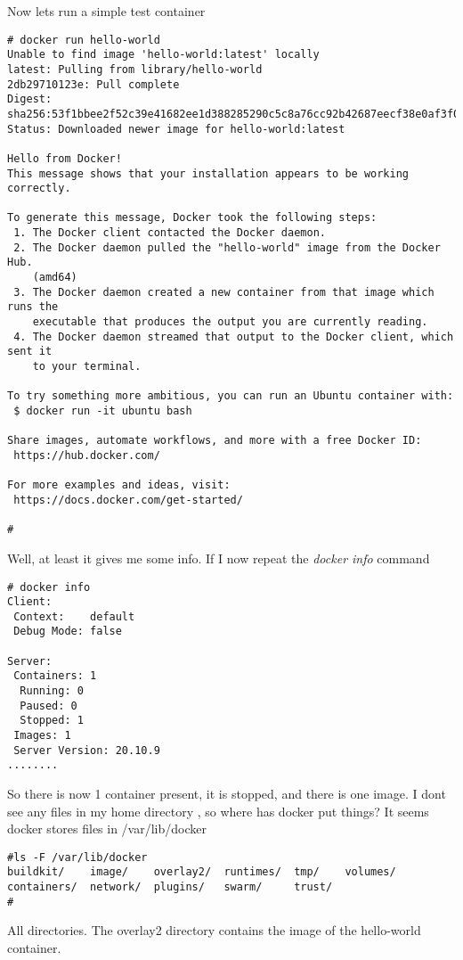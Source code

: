 \documentclass{article}  %
\begin{document}
Now lets run a simple test container
\begin{verbatim}
# docker run hello-world
Unable to find image 'hello-world:latest' locally
latest: Pulling from library/hello-world
2db29710123e: Pull complete 
Digest: sha256:53f1bbee2f52c39e41682ee1d388285290c5c8a76cc92b42687eecf38e0af3f0
Status: Downloaded newer image for hello-world:latest

Hello from Docker!
This message shows that your installation appears to be working correctly.

To generate this message, Docker took the following steps:
 1. The Docker client contacted the Docker daemon.
 2. The Docker daemon pulled the "hello-world" image from the Docker Hub.
    (amd64)
 3. The Docker daemon created a new container from that image which runs the
    executable that produces the output you are currently reading.
 4. The Docker daemon streamed that output to the Docker client, which sent it
    to your terminal.

To try something more ambitious, you can run an Ubuntu container with:
 $ docker run -it ubuntu bash

Share images, automate workflows, and more with a free Docker ID:
 https://hub.docker.com/

For more examples and ideas, visit:
 https://docs.docker.com/get-started/

# 
\end{verbatim} 

Well, at least it gives me some info. If I now repeat the {\em docker info} command
\begin{verbatim}
# docker info
Client:
 Context:    default
 Debug Mode: false

Server:
 Containers: 1
  Running: 0
  Paused: 0
  Stopped: 1
 Images: 1
 Server Version: 20.10.9
........
\end{verbatim}
So there is now 1 container present, it is stopped, and there is one image.
I dont see any files in my home directory , so where has docker put things? It  seems docker stores files in /var/lib/docker
\begin{verbatim}
#ls -F /var/lib/docker
buildkit/    image/    overlay2/  runtimes/  tmp/    volumes/
containers/  network/  plugins/   swarm/     trust/
# 
\end{verbatim}
All directories. The overlay2  directory contains the image of the hello-world container.
\end{document}
